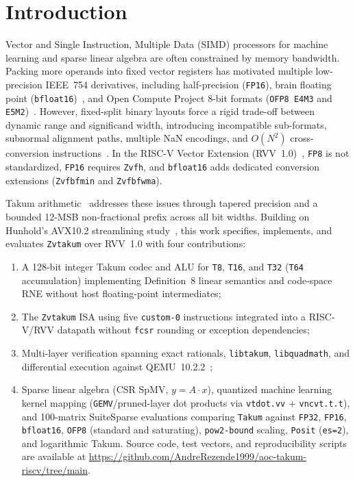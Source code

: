 \documentclass[conference]{IEEEtran}
\begin{document}
\section{Introduction}
Vector and Single Instruction, Multiple Data (SIMD) processors for machine learning and sparse linear algebra are often constrained by memory bandwidth. Packing more operands into fixed vector registers has motivated multiple low-precision IEEE~754 derivatives, including half-precision (\texttt{FP16}), brain floating point (\texttt{bfloat16})~\cite{bfloat16}, and Open Compute Project 8-bit formats (\texttt{OFP8 E4M3} and \texttt{E5M2})~\cite{ofp8,micikevicius2022fp8}. However, fixed-split binary layouts force a rigid trade-off between dynamic range and significand width, introducing incompatible sub-formats, subnormal alignment paths, multiple NaN encodings, and $O(N^2)$ cross-conversion instructions~\cite{hunhold2025avx102}. In the RISC-V Vector Extension (RVV~1.0)~\cite{riscv-v-spec}, \texttt{FP8} is not standardized, \texttt{FP16} requires \texttt{Zvfh}, and \texttt{bfloat16} adds dedicated conversion extensions (\texttt{Zvfbfmin} and \texttt{Zvfbfwma}).

Takum arithmetic~\cite{hunhold2024takum} addresses these issues through tapered precision and a bounded 12-MSB non-fractional prefix across all bit widths. Building on Hunhold's AVX10.2 streamlining study~\cite{hunhold2025avx102}, this work specifies, implements, and evaluates \texttt{Zvtakum} over RVV~1.0 with four contributions:
\begin{enumerate}
    \item A 128-bit integer Takum codec and ALU for \texttt{T8}, \texttt{T16}, and \texttt{T32} (\texttt{T64} accumulation) implementing Definition~8 linear semantics and code-space RNE without host floating-point intermediates;
    \item The \texttt{Zvtakum} ISA using five \texttt{custom-0} instructions integrated into a RISC-V/RVV datapath without \texttt{fcsr} rounding or exception dependencies;
    \item Multi-layer verification spanning exact rationals, \texttt{libtakum}, \texttt{libquadmath}, and differential execution against QEMU~10.2.2~\cite{qemu};
    \item Sparse linear algebra (CSR SpMV, $y = A\cdot x$), quantized machine learning kernel mapping (\texttt{GEMV}/pruned-layer dot products via \texttt{vtdot.vv} + \texttt{vncvt.t.t}), and 100-matrix SuiteSparse evaluations comparing \texttt{Takum} against \texttt{FP32}, \texttt{FP16}, \texttt{bfloat16}, \texttt{OFP8} (standard and saturating), \texttt{pow2-bound} scaling, \texttt{Posit} (\texttt{es=2}), and logarithmic Takum. Source code, test vectors, and reproducibility scripts are available at \url{https://github.com/AndreRezende1999/aoc-takum-riscv/tree/main}.
\end{enumerate}
\end{document}
